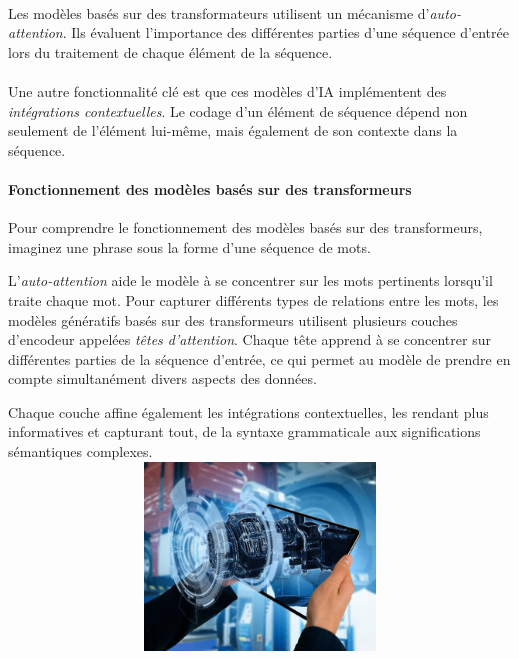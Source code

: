\paragraph{}
Les modèles basés sur des transformateurs utilisent un mécanisme d'\textit{auto-attention}.
Ils évaluent l'importance des différentes parties d'une séquence d'entrée lors
du traitement de chaque élément de la séquence.

\paragraph{}
Une autre fonctionnalité clé est que ces modèles d’IA implémentent des \textit{intégrations
contextuelles}. Le codage d'un élément de séquence dépend non seulement de l'élément
lui-même, mais également de son contexte dans la séquence.

\paragraph{Fonctionnement des modèles basés sur des transformeurs}
Pour comprendre le fonctionnement des modèles basés sur des transformeurs,
imaginez une phrase sous la forme d’une séquence de mots.

L'\textit{auto-attention} aide le modèle à se concentrer sur les mots pertinents
lorsqu'il traite chaque mot. Pour capturer différents types de relations entre
les mots, les modèles génératifs basés sur des transformeurs utilisent plusieurs
couches d’encodeur appelées \textit{têtes d’attention}. Chaque tête apprend à se
concentrer sur différentes parties de la séquence d’entrée, ce qui permet au
modèle de prendre en compte simultanément divers aspects des données.

Chaque couche affine également les intégrations contextuelles, les rendant plus informatives
et capturant tout, de la syntaxe grammaticale aux significations sémantiques
complexes.
\vspace{1cm}
\includegraphics[width=1\textwidth, height=5cm]{images/3D-Model-1-300x245.png}
\vspace{0.5cm}

